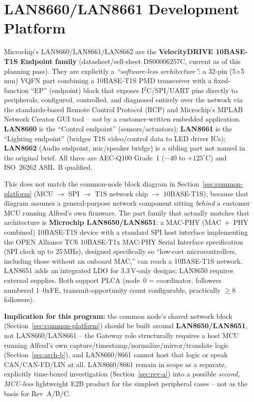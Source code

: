 \section{LAN8660/LAN8661 Development Platform}
\label{sec:lan866x}

\begin{risknote}[title={Verified against primary Microchip sources -- the named parts are not what the block diagrams assume}]
Microchip's LAN8660/LAN8661/LAN8662 are the \textbf{VelocityDRIVE 10BASE-T1S Endpoint family} (datasheet/sell-sheet DS00006257C, current as of this planning pass). They are explicitly a \emph{``software-less architecture''}: a 32-pin (5$\times$5\,mm) VQFN part combining a 10BASE-T1S PMD transceiver with a fixed-function ``EP'' (endpoint) block that exposes I$^2$C/SPI/UART pins directly to peripherals, configured, controlled, and diagnosed entirely over the network via the standards-based Remote Control Protocol (RCP) and Microchip's MPLAB Network Creator GUI tool -- \emph{not} by a customer-written embedded application. \textbf{LAN8660} is the ``Control endpoint'' (sensors/actuators); \textbf{LAN8661} is the ``Lighting endpoint'' (bridges T1S video/control data to LED driver ICs); \textbf{LAN8662} (Audio endpoint, mic/speaker bridge) is a sibling part not named in the original brief. All three are AEC-Q100 Grade~1 ($-40$ to $+125^\circ$C) and ISO~26262 ASIL~B qualified.

This does not match the common-node block diagram in Section~\ref{sec:common-platform} (MCU $\rightarrow$ SPI $\rightarrow$ T1S network chip $\rightarrow$ 10BASE-T1S), because that diagram assumes a general-purpose network component sitting \emph{behind} a customer MCU running Alfred's own firmware. The part family that actually matches that architecture is \textbf{Microchip LAN8650/LAN8651}: a MAC-PHY (MAC~+~PHY combined) 10BASE-T1S device with a standard SPI host interface implementing the OPEN Alliance TC6 10BASE-T1x MAC-PHY Serial Interface specification (SPI clock up to 25\,MHz), designed specifically so ``low-cost microcontrollers, including those without an onboard MAC,'' can reach a 10BASE-T1S network. LAN8651 adds an integrated LDO for 3.3\,V-only designs; LAN8650 requires external supplies. Both support PLCA (node~0 = coordinator, followers numbered 1--0xFE, transmit-opportunity count configurable, practically $\geq$8 followers).

\textbf{Implication for this program:} the common node's shared network block (Section~\ref{sec:common-platform}) should be built around \textbf{LAN8650/LAN8651}, not LAN8660/LAN8661 -- the Gateway role structurally requires a host MCU running Alfred's own capture/timestamp/normalize/mirror/translate logic (Section~\ref{sec:arch-b}), and LAN8660/8661 cannot host that logic or speak CAN/CAN-FD/LIN at all. LAN8660/8661 remain in scope as a separate, explicitly time-boxed investigation (Section~\ref{sec:rev-a}) into a possible \emph{second, MCU-less} lightweight E2B product for the simplest peripheral cases -- not as the basis for Rev~A/B/C.
\end{risknote}

